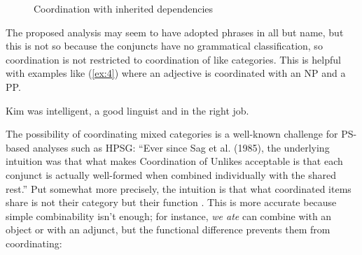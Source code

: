\documentclass[output=paper]{langscibook}
\begin{document}
\begin{figure}
	\centering
{}
	\caption{Coordination with inherited dependencies}
	\label{fig:11}
\end{figure}

The proposed analysis may seem to have adopted phrases in all but name, but this is not so because the conjuncts have no grammatical classification, so coordination is not restricted to coordination of like categories. This is helpful with examples like (\ref{ex:4}) where an adjective is coordinated with an NP and a PP.

\begin{exe}
	\ex \label{ex:4} Kim was intelligent, a good linguist and in the right job.
\end{exe}

The possibility of coordinating mixed categories is a well-known challenge for PS-based analyses such as HPSG: ``Ever since Sag et al. (1985), the underlying intuition was that what makes Coordination of Unlikes acceptable is that each conjunct is actually well-formed when combined individually with the shared rest.'' \citep[61]{Crysmann2003c} Put somewhat more precisely, the intuition is that what coordinated items share is not their category but their function \citep[414]{Hudson90a-u}. This is more accurate because simple combinability isn’t enough; for instance, \emph{we ate} can combine with an object or with an adjunct, but the functional difference prevents them from coordinating:
\end{document}
